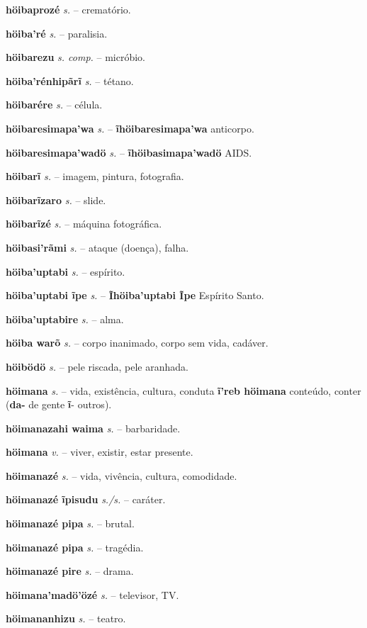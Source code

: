 \textbf{höibaprozé} \textit{s.} -- crematório.

\textbf{höiba'ré} \textit{s.} -- paralisia.

\textbf{höibarezu} \textit{s. comp.} -- micróbio.

\textbf{höiba'rénhipãrĩ} \textit{s.} -- tétano.

\textbf{höibarére} \textit{s.} -- célula.

\textbf{höibaresimapa'wa} \textit{s.} -- \textbf{ĩhöibaresimapa'wa} anticorpo.

\textbf{höibaresimapa'wadö} \textit{s.} -- \textbf{ĩhöibasimapa'wadö} AIDS.

\textbf{höibarĩ} \textit{s.} -- imagem, pintura, fotografia.

\textbf{höibarĩzaro} \textit{s.} -- slide.

\textbf{höibarĩzé} \textit{s.} -- máquina fotográfica.

\textbf{höibasi'rãmi} \textit{s.} -- ataque (doença), falha.

\textbf{höiba'uptabi} \textit{s.} -- espírito.

\textbf{höiba'uptabi ĩpe} \textit{s.} -- \textbf{Ĩhöiba'uptabi Ĩpe} Espírito Santo.

\textbf{höiba'uptabire} \textit{s.} -- alma.

\textbf{höiba warõ} \textit{s.} -- corpo inanimado, corpo sem vida, cadáver.

\textbf{höibödö} \textit{s.} -- pele riscada, pele aranhada.

\textbf{höimana} \textit{s.} -- vida, existência, cultura, conduta  \textbf{ĩ'reb höimana} conteúdo, conter (\textbf{da-} de gente  \textbf{ĩ}- outros).

\textbf{höimanazahi waima} \textit{s.} -- barbaridade.

\textbf{höimana} \textit{v.} -- viver, existir, estar presente.

\textbf{höimanazé} \textit{s.} -- vida, vivência, cultura, comodidade.

\textbf{höimanazé ĩpisudu} \textit{s./s.} -- caráter.

\textbf{höimanazé pipa} \textit{s.} -- brutal.

\textbf{höimanazé pipa} \textit{s.} -- tragédia.

\textbf{höimanazé pire} \textit{s.} -- drama.

\textbf{höimana'madö'özé} \textit{s.} -- televisor, TV.

\textbf{höimananhizu} \textit{s.} -- teatro.

